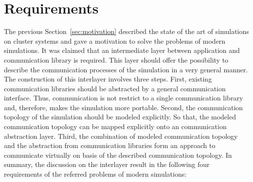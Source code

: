 



\section{Requirements}
\label{sec:requirements}

The previous Section~\ref{sec:motivation} described the state of the
art of simulations on cluster systems and gave a motivation to solve
the problems of modern simulations.
It was claimed that an intermediate layer between application and
communication library is required.  This layer should offer the
possibility to describe the communication processes of the simulation
in a very general manner.  The construction of this interlayer
involves three steps.  First, existing communication libraries should
be abstracted by a general communication interface. Thus,
communication is not restrict to a single communication library and,
therefore, makes the simulation more portable.  Second, the
communication topology of the simulation should be modeled explicitly.
So that, the modeled communication topology can be mapped explicitly
onto an communication abstraction layer.  Third, the combination of
modeled communication topology and the abstraction from communication
libraries form an approach to communicate virtually on basis of the
described communication topology.  In summary, the discussion on the
interlayer result in the following four requirements of the referred
problems of modern simulations:

